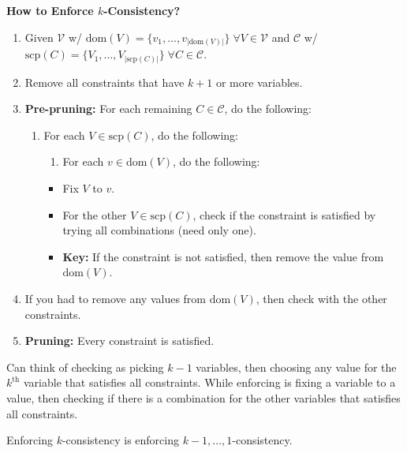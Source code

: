 \begin{process} \textbf{How to Enforce $k$-Consistency?} 
    \begin{enumerate}
        \item Given $\mathcal{V}$ w/ $\text{dom}(V) = \{v_1,\ldots,v_{|\text{dom}(V)|}\} \; \forall V \in \mathcal{V}$ and $\mathcal{C}$ w/ $\text{scp}(C) = \{V_1,\ldots,V_{|\text{scp}(C)|}\} \; \forall C \in \mathcal{C}$.
        \item Remove all constraints that have $k+1$ or more variables.
        \item \textbf{Pre-pruning:} For each remaining $C \in \mathcal{C}$, do the following:
        \begin{enumerate}
            \item For each $V \in \text{scp}(C)$, do the following:
            \begin{enumerate}
                \item For each $v \in \text{dom}(V)$, do the following:
            \end{enumerate}
            \begin{itemize}
                \item Fix $V$ to $v$.
                \item For the other $V \in \text{scp}(C)$, check if the constraint is satisfied by trying all combinations (need only one). 
                \item \textbf{Key:} If the constraint is not satisfied, then remove the value from $\text{dom}(V)$.
            \end{itemize}
        \end{enumerate}
        \item If you had to remove any values from $\text{dom}(V)$, then check with the other constraints.
        \item \textbf{Pruning:} Every constraint is satisfied.
    \end{enumerate}
\end{process}

\begin{warning}
    Can think of checking as picking $k-1$ variables, then choosing any value for the $k^\text{th}$ variable that satisfies all constraints. While enforcing is fixing a variable to a value, then checking if there is a combination for the other variables that satisfies all constraints.
\end{warning}

\begin{warning}
    Enforcing $k$-consistency is enforcing $k-1,\ldots,1$-consistency.
\end{warning}

